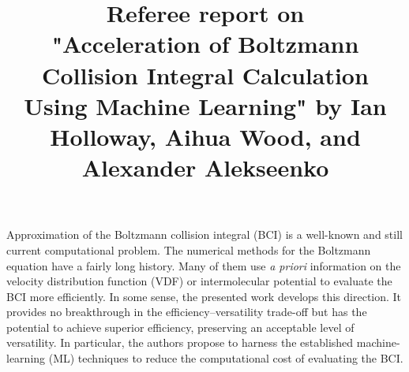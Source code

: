 \documentclass[11pt]{article}
\title{Referee report on \\
"Acceleration of Boltzmann Collision Integral Calculation Using Machine Learning"
by Ian Holloway, Aihua Wood, and  Alexander Alekseenko}
\date{}
\begin{document}
\maketitle

Approximation of the Boltzmann collision integral (BCI) is a well-known and still current computational problem.
The numerical methods for the Boltzmann equation have a fairly long history.
Many of them use \emph{a priori} information on the velocity distribution function (VDF)
or intermolecular potential to evaluate the BCI more efficiently.
In some sense, the presented work develops this direction.
It provides no breakthrough in the efficiency--versatility trade-off
but has the potential to achieve superior efficiency, preserving an acceptable level of versatility.
In particular, the authors propose to harness the established machine-learning (ML) techniques
to reduce the computational cost of evaluating the BCI.
\end{document}
